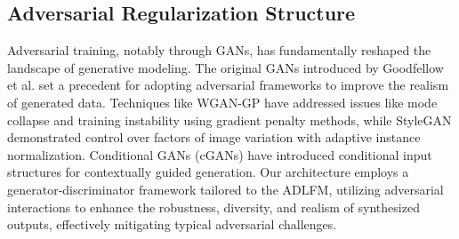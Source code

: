 \subsection{Adversarial Regularization Structure}

Adversarial training, notably through GANs, has fundamentally reshaped the landscape of generative modeling. The original GANs introduced by Goodfellow et al. \cite{goodfellow2014generative} set a precedent for adopting adversarial frameworks to improve the realism of generated data. Techniques like WGAN-GP \cite{gulrajani2017improved} have addressed issues like mode collapse and training instability using gradient penalty methods, while StyleGAN \cite{karras2019style} demonstrated control over factors of image variation with adaptive instance normalization. Conditional GANs (cGANs) \cite{mirza2014conditional} have introduced conditional input structures for contextually guided generation. Our architecture employs a generator-discriminator framework tailored to the ADLFM, utilizing adversarial interactions to enhance the robustness, diversity, and realism of synthesized outputs, effectively mitigating typical adversarial challenges.


